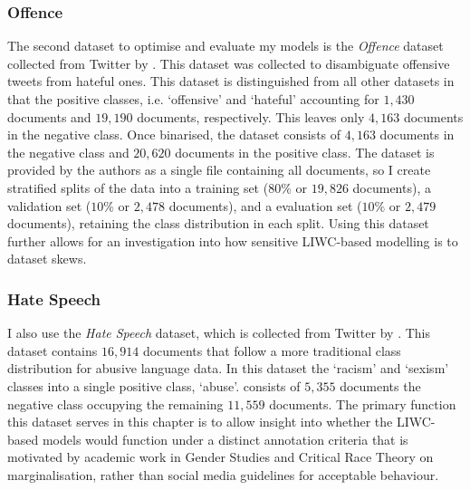 \subsubsection{Offence}  
The second dataset  to optimise and evaluate my models is the \textit{Offence} dataset collected from Twitter by \citet{Davidson:2017}.  
This dataset was collected to disambiguate offensive tweets from hateful ones.  
This dataset is distinguished from all other datasets in that the positive classes, i.e. `offensive' and `hateful' accounting for $1,430$ documents and $19,190$ documents, respectively.  
This leaves only $4,163$ documents in the negative class.  
Once binarised, the dataset consists of $4,163$ documents in the negative class and $20,620$ documents in the positive class.  
The dataset is provided by the authors as a single file containing all documents, so I create stratified splits of the data into a training set ($80\%$ or $19,826$ documents), a validation set ($10\%$ or $2,478$ documents), and a evaluation set ($10\%$ or $2,479$ documents), retaining the class distribution in each split.  
Using this dataset further allows for an investigation into how sensitive LIWC-based modelling is to dataset skews.  
  
\subsubsection{Hate Speech}  
I also use the \textit{Hate Speech} dataset, which is collected from Twitter by \citet{Waseem-Hovy:2016}.  
This dataset contains $16,914$ documents that follow a more traditional class distribution for abusive language data.  
In this dataset  the  `racism' and `sexism' classes into a single positive class, `abuse'.   
 consists of $5,355$ documents  the negative class occupying the remaining $11,559$ documents.  
The primary function  this dataset serves in this chapter is to allow  insight into whether the LIWC-based models would function under a distinct annotation criteria that is motivated by academic work in Gender Studies and Critical Race Theory on marginalisation, rather than social media guidelines for acceptable behaviour.  
  
